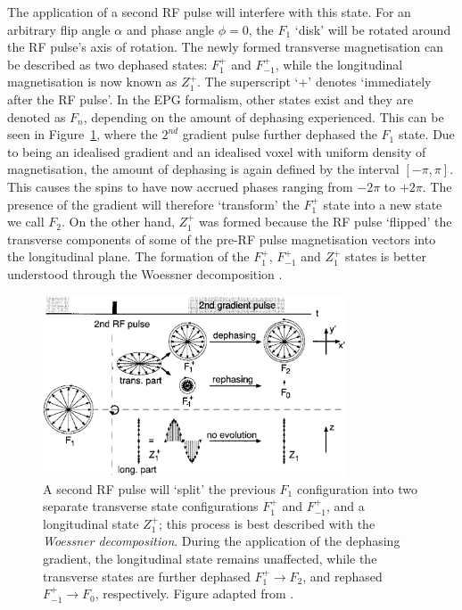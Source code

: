 \hfill

The application of a second RF pulse will interfere with this state.
For an arbitrary flip angle $\alpha$ and phase angle $\phi = 0$, the $F_1$ `disk' will be rotated around the RF pulse's axis of rotation.
The newly formed transverse magnetisation can be described as two dephased states: $F^+_1$ and $F^+_{-1}$, while the longitudinal magnetisation is now known as $Z^+_1$.
The superscript `+' denotes `immediately after the RF pulse'.
In the EPG formalism, other states exist and they are denoted as $F_n$, depending on the amount of dephasing experienced.
This can be seen in Figure~\ref{fig:EPGeffectofgrad}, where the $2^{nd}$ gradient pulse further dephased the $F_1$ state.
Due to being an idealised gradient and an idealised voxel with uniform density of magnetisation, the amount of dephasing is again defined by the interval $[-\pi, \pi]$.
This causes the spins to have now accrued phases ranging from $-2 \pi$ to $+2 \pi$.
The presence of the gradient will therefore `transform' the $F_1^+$ state into a new state we call $F_2$.
On the other hand, $Z^+_1$ was formed because the RF pulse `flipped' the transverse components of some of the pre-RF pulse magnetisation vectors into the longitudinal plane.
The formation of the $F_1^+$, $F_{-1}^+$ and $Z_1^+$ states is better understood through the Woessner decomposition \cite{Woessner1961}.

\begin{figure}[ht]
    \centering
    \includegraphics[angle=0,width=0.8\textwidth, keepaspectratio]{images/mrf/EPGeffectofgrad}
    \caption{A second RF pulse will `split' the previous $F_1$ configuration into two separate transverse state configurations $F_1^+$ and $F_{-1}^+$, and a longitudinal state $Z_1^+$; this process is best described with the \textit{Woessner decomposition}. During the application of the dephasing gradient, the longitudinal state remains unaffected, while the transverse states are further dephased $F_1^+ \rightarrow F_2$, and rephased $F_{-1}^+ \rightarrow F_0$, respectively. Figure adapted from \cite{Scheffler1999}.}
    \label{fig:EPGeffectofgrad}
\end{figure}

